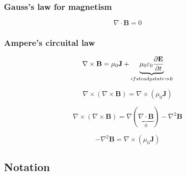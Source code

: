 \documentclass[a4paper,10pt]{book}
\begin{document}
\subsubsection{Gauss's law for magnetism}

    \begin{equation}
    \nabla\cdot\mathbf{B} = 0
    \end{equation}

\subsubsection{Ampere's circuital law}

    \begin{equation}
    \nabla\times\mathbf{B} = \mu_0\mathbf{J}+\underbrace{\mu_0\varepsilon_0\frac{\partial\mathbf{E}}{\partial{t}}}_{\textrm\footnotesize{if steady state} \Rightarrow 0}
    \end{equation}

    \begin{equation}
    \nabla\times\left(\nabla\times\mathbf{B}\right)=\nabla\times\left(\mu_0\mathbf{J}\right)
    \end{equation}

    \begin{equation}
    \nabla\times\left(\nabla\times\mathbf{B}\right)=\nabla\left(\underbrace{\nabla\cdot\mathbf{B}}_{0}\right)-\nabla^2\mathbf{B}
    \end{equation}

    \begin{equation}
    -\nabla^2\mathbf{B}=\nabla\times\left(\mu_0\mathbf{J}\right)
    \end{equation}

\subsection{Notation}
\end{document}
